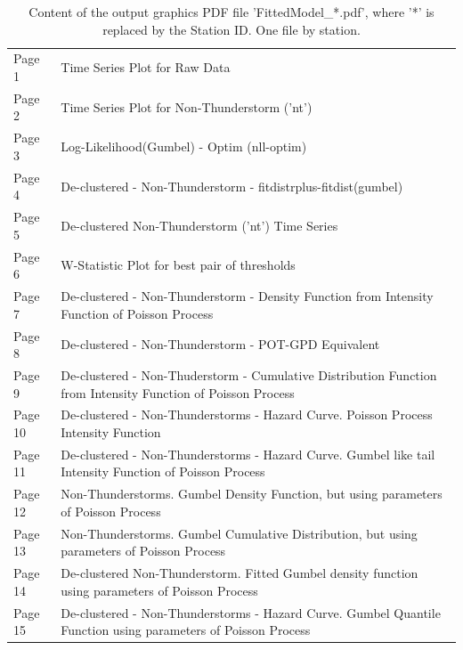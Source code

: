 \documentclass[12pt,twoside]{reedthesis}
\begin{document}
\begingroup\fontsize{8}{10}\selectfont
\begin{longtable}[t]{>{\raggedright\arraybackslash}p{0.4in}>{\raggedright\arraybackslash}p{5.7in}}
\caption[Content of FittedModel\_*.pdf]{\label{tab:fittedmodelidpdf}Content of the output graphics PDF file 'FittedModel\_*.pdf', where '*' is replaced by the Station ID. One file by station.}\\
\toprule
\multicolumn{1}{l}{Graphic} & \multicolumn{1}{l}{Description}\\
\midrule
Page 1 & Time Series Plot for Raw Data\\
Page 2 & Time Series Plot for Non-Thunderstorm ('nt')\\
Page 3 & Log-Likelihood(Gumbel) - Optim (nll-optim)\\
Page 4 & De-clustered - Non-Thunderstorm - fitdistrplus-fitdist(gumbel)\\
Page 5 & De-clustered Non-Thunderstorm ('nt') Time Series\\
Page 6 & W-Statistic Plot for best pair of thresholds\\
Page 7 & De-clustered - Non-Thunderstorm - Density Function from Intensity Function of Poisson Process\\
Page 8 & De-clustered - Non-Thunderstorm - POT-GPD Equivalent\\
Page 9 & De-clustered - Non-Thuderstorm - Cumulative Distribution Function from Intensity Function of Poisson Process\\
Page 10 & De-clustered - Non-Thunderstorms - Hazard Curve. Poisson Process Intensity Function\\
Page 11 & De-clustered - Non-Thunderstorms - Hazard Curve. Gumbel like tail Intensity Function of Poisson Process\\
Page 12 & Non-Thunderstorms. Gumbel Density Function, but using parameters of Poisson Process\\
Page 13 & Non-Thunderstorms. Gumbel Cumulative Distribution, but using parameters of Poisson Process\\
Page 14 & De-clustered Non-Thunderstorm. Fitted Gumbel density function using parameters of Poisson Process\\
Page 15 & De-clustered - Non-Thunderstorms - Hazard Curve. Gumbel Quantile Function using parameters of Poisson Process\\
\bottomrule
\end{longtable}
\endgroup{}
\end{document}
